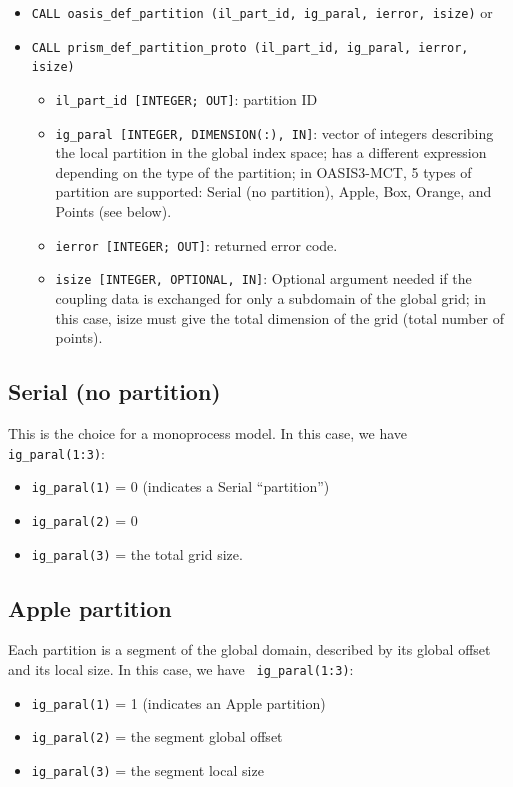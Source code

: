 \begin{itemize}

  \vspace{0.2cm}
\item {\tt CALL oasis\_def\_partition (il\_part\_id, ig\_paral,
    ierror, isize)} or
\item {\tt CALL prism\_def\_partition\_proto (il\_part\_id, ig\_paral,
    ierror, isize)}

  \begin{itemize}
  \item {\tt il\_part\_id [INTEGER; OUT]}: partition ID
  \item {\tt ig\_paral [INTEGER, DIMENSION(:), IN]}: vector of
    integers describing the local partition in the global index space;
    has a different expression depending on the type of the partition;
    in OASIS3-MCT, 5 types of partition are supported: Serial (no
    partition), Apple, Box, Orange, and Points (see below).
  \item {\tt ierror [INTEGER; OUT]}: returned error code.
  \item {\tt isize [INTEGER, OPTIONAL, IN]}: Optional argument needed
    if the coupling data is exchanged for only a subdomain of the
    global grid; in this case, isize must give the total dimension of
    the grid (total number of points).
  \end{itemize}
\end{itemize}

\subsection{Serial (no partition)}

This is the choice for a monoprocess model. In this case, we have {\tt
  ig\_paral(1:3)}:
\begin{itemize}
\item {\tt ig\_paral(1)} = 0 (indicates a Serial ``partition'')
\item {\tt ig\_paral(2)} = 0
\item {\tt ig\_paral(3)} = the total grid size.
\end{itemize}

\subsection{Apple partition}

Each partition is a segment of the global domain, described by its
global offset and its local size. In this case, we have {\tt
  ig\_paral(1:3)}:
\begin{itemize}
\item {\tt ig\_paral(1)} = 1 (indicates an Apple partition)
\item {\tt ig\_paral(2)} = the segment global offset
\item {\tt ig\_paral(3)} = the segment local size
\end{itemize}

